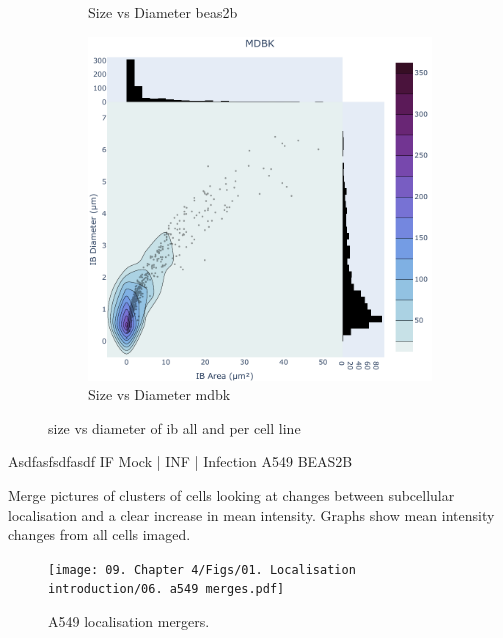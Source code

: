 \begin{figure}
\begin{subfigure}{0.3\textwidth}
    \caption[]{Size vs Diameter beas2b}
    \end{subfigure}
    \begin{subfigure}{0.3\textwidth}
    \includegraphics[width=1\linewidth]{09. Chapter 4/Figs/01. Localisation introduction/05. heatmap_mdbk.pdf} 
    \caption[]{Size vs Diameter mdbk}
    \end{subfigure}
    \caption[size vs diameter of ib all and per cell line]{size vs diameter of ib all and per cell line}
    \label{fig:size vs diameter of ib all and per cell line}
\end{figure}


Asdfasfsdfasdf \newline
IF Mock | INF | Infection \newline
A549 BEAS2B

Merge pictures of clusters of cells looking at changes between subcellular localisation and a clear increase in mean intensity. Graphs show mean intensity changes from all cells imaged.

\begin{figure}
    \centering
    \texttt{[image: 09. Chapter 4/Figs/01. Localisation introduction/06. a549 merges.pdf]}
    \caption[A549 localisation mergers.]{A549 localisation mergers.}
    \label{fig:A549 localisation mergers.}
\end{figure}


